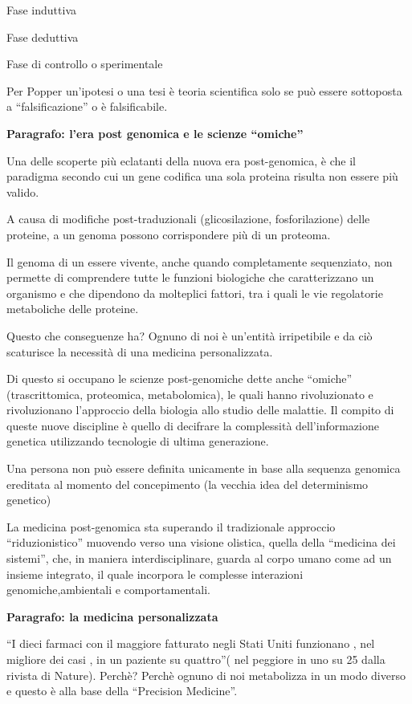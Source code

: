 \documentclass[]{article}
\begin{document}
\begin{enumerate}
  Fase induttiva

  Fase deduttiva

  Fase di controllo o sperimentale

  Per Popper un'ipotesi o una tesi è teoria scientifica solo se può
  essere sottoposta a ``falsificazione'' o è falsificabile.

  \textbf{Paragrafo: l'era post genomica e le scienze ``omiche''}

  Una delle scoperte più eclatanti della nuova era post-genomica, è che
  il paradigma secondo cui un gene codifica una sola proteina risulta
  non essere più valido.

  A causa di modifiche post-traduzionali (glicosilazione,
  fosforilazione) delle proteine, a un genoma possono corrispondere più
  di un proteoma.

  Il genoma di un essere vivente, anche quando completamente
  sequenziato, non permette di comprendere tutte le funzioni biologiche
  che caratterizzano un organismo e che dipendono da molteplici fattori,
  tra i quali le vie regolatorie metaboliche delle proteine.

  Questo che conseguenze ha? Ognuno di noi è un'entità irripetibile e da
  ciò scaturisce la necessità di una medicina personalizzata.

  Di questo si occupano le scienze post-genomiche dette anche ``omiche''
  (trascrittomica, proteomica, metabolomica), le quali hanno
  rivoluzionato e rivoluzionano l'approccio della biologia allo studio
  delle malattie. Il compito di queste nuove discipline è quello di
  decifrare la complessità dell'informazione genetica utilizzando
  tecnologie di ultima generazione.

  Una persona non può essere definita unicamente in base alla sequenza
  genomica ereditata al momento del concepimento (la vecchia idea del
  determinismo genetico)

  La medicina post-genomica sta superando il tradizionale approccio
  ``riduzionistico'' muovendo verso una visione olistica, quella della
  ``medicina dei sistemi'', che, in maniera interdisciplinare, guarda al
  corpo umano come ad un insieme integrato, il quale incorpora le
  complesse interazioni genomiche,ambientali e comportamentali.

  \textbf{Paragrafo: la medicina personalizzata}

  ``I dieci farmaci con il maggiore fatturato negli Stati Uniti
  funzionano , nel migliore dei casi , in un paziente su quattro''( nel
  peggiore in uno su 25 dalla rivista di Nature). Perchè? Perchè ognuno
  di noi metabolizza in un modo diverso e questo è alla base della
  ``Precision Medicine''.


\end{enumerate}
\end{document}
